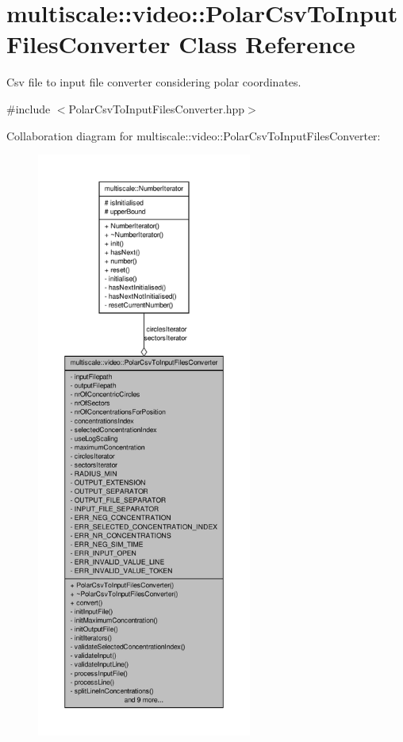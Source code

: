 \hypertarget{classmultiscale_1_1video_1_1PolarCsvToInputFilesConverter}{\section{multiscale\-:\-:video\-:\-:\-Polar\-Csv\-To\-Input\-Files\-Converter \-Class \-Reference}
\label{classmultiscale_1_1video_1_1PolarCsvToInputFilesConverter}
}


\-Csv file to input file converter considering polar coordinates.  




{\ttfamily \#include $<$\-Polar\-Csv\-To\-Input\-Files\-Converter.\-hpp$>$}



\-Collaboration diagram for multiscale\-:\-:video\-:\-:\-Polar\-Csv\-To\-Input\-Files\-Converter\-:\nopagebreak
\begin{figure}[H]
\begin{center}
\leavevmode
\includegraphics[height=550pt]{classmultiscale_1_1video_1_1PolarCsvToInputFilesConverter__coll__graph}
\end{center}
\end{figure}
